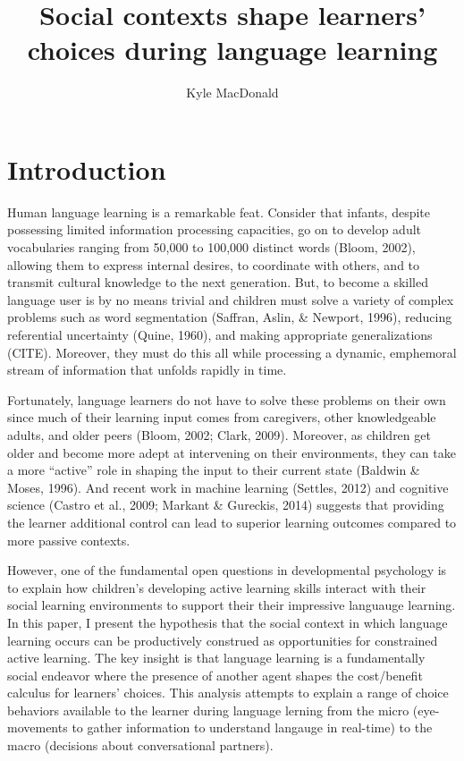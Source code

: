 \documentclass[a4paper,man,apacite,floatsintext]{apa6}
\date{}
\title{\textbf{Social contexts shape learners' choices during language learning}}
\author{Kyle MacDonald}
\affiliation{Department of Psychology, Stanford University}
\begin{document}
\maketitle

\section{Introduction}\label{introduction}

Human language learning is a remarkable feat. Consider that infants,
despite possessing limited information processing capacities, go on to
develop adult vocabularies ranging from 50,000 to 100,000 distinct words
(Bloom, 2002), allowing them to express internal desires, to coordinate
with others, and to transmit cultural knowledge to the next generation.
But, to become a skilled language user is by no means trivial and
children must solve a variety of complex problems such as word
segmentation (Saffran, Aslin, \& Newport, 1996), reducing referential
uncertainty (Quine, 1960), and making appropriate generalizations
(CITE). Moreover, they must do this all while processing a dynamic,
emphemoral stream of information that unfolds rapidly in time.

Fortunately, language learners do not have to solve these problems on
their own since much of their learning input comes from caregivers,
other knowledgeable adults, and older peers (Bloom, 2002; Clark, 2009).
Moreover, as children get older and become more adept at intervening on
their environments, they can take a more ``active'' role in shaping the
input to their current state (Baldwin \& Moses, 1996). And recent work
in machine learning (Settles, 2012) and cognitive science (Castro et
al., 2009; Markant \& Gureckis, 2014) suggests that providing the
learner additional control can lead to superior learning outcomes
compared to more passive contexts.

However, one of the fundamental open questions in developmental
psychology is to explain how children's developing active learning
skills interact with their social learning environments to support their
their impressive languauge learning. In this paper, I present the
hypothesis that the social context in which language learning occurs can
be productively construed as opportunities for constrained active
learning. The key insight is that language learning is a fundamentally
social endeavor where the presence of another agent shapes the
cost/benefit calculus for learners' choices. This analysis attempts to
explain a range of choice behaviors available to the learner during
language lerning from the micro (eye-movements to gather information to
understand langauge in real-time) to the macro (decisions about
conversational partners).
\end{document}
